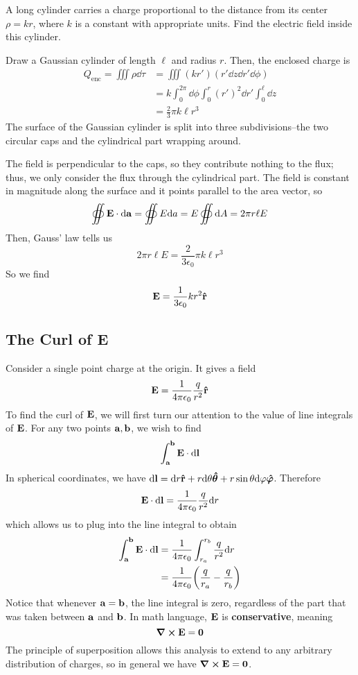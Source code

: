 \begin{example}
    A long cylinder carries a charge proportional to the distance from its center $\rho = kr$, where $k$ is a constant with appropriate units. Find the electric field inside this cylinder.

    Draw a Gaussian cylinder of length $\ell$ and radius $r$. Then, the enclosed charge is 
    \begin{align*}
        Q_\text{enc} = \iiint \rho \dd \tau &= \iiint (kr')(r'\dd z\dd r'\dd \phi) \\
        &= k\int_0^{2\pi}\dd \phi \int_0^r (r')^2\dd r' \int_0^\ell \dd z \\
        &= \frac{2}{3}\pi k\ell r^3
    \end{align*}
    The surface of the Gaussian cylinder is split into three subdivisions--the two circular caps and the cylindrical part wrapping around. 

    The field is perpendicular to the caps, so they contribute nothing to the flux; thus, we only consider the flux through the cylindrical part. The field is constant in magnitude along the surface and it points parallel to the area vector, so
    \[ \oiint \mathbf{E} \cdot \dd \mathbf{a} = \oiint E\dd a = E\oiint \dd A = 2\pi r \ell E\]
    Then, Gauss' law tells us
    \[ 2\pi r \ell E = \frac{2}{3\epsilon_0}\pi k \ell r^3\]
    So we find
    \[ \mathbf{E} = \frac{1}{3\epsilon_0}kr^2\mathbf{\hat{r}} \]
\end{example}
\subsection*{The Curl of E}
Consider a single point charge at the origin. It gives a field
\[ \mathbf{E} = \frac{1}{4\pi \epsilon_0} \frac{q}{r^2} \mathbf{\hat{r}} \]
To find the curl of $\mathbf{E}$, we will first turn our attention to the value of line integrals of $\mathbf{E}$. For any two points $\mathbf{a}, \mathbf{b}$, we wish to find
\[ \int_{\mathbf{a}}^{\mathbf{b}} \mathbf{E} \cdot \dd \mathbf{l}\]
In spherical coordinates, we have $\dd\mathbf{l} = \dd r \mathbf{\hat{r}} + r\dd\theta\boldsymbol{\hat\theta} + r\sin\theta \dd\varphi\boldsymbol{\hat{\varphi}}$. Therefore
\[ \mathbf{E} \cdot \dd \mathbf{l} = \frac{1}{4\pi \epsilon_0}\frac{q}{r^2}\dd r\]
which allows us to plug into the line integral to obtain
\begin{align*}
    \int_\mbf{a}^\mbf{b} \mbf E \cdot \dd \mbf l &= \K \int_{r_a}^{r_b} \frac{q}{r^2}\dd r \\
    &= \K \pqty{\frac{q}{r_a}-\frac{q}{r_b}}
\end{align*}
Notice that whenever $\mathbf{a} = \mathbf{b}$, the line integral is zero, regardless of the part that was taken between $\mathbf{a}$ and $\mathbf{b}$. In math language, $\mathbf{E}$ is \textbf{conservative}, meaning 
\begin{equation}
    \curl\mathbf{E} = \mathbf{0}
\end{equation}
The principle of superposition allows this analysis to extend to any arbitrary distribution of charges, so in general we have $\curl\mathbf{E} = \mathbf{0}$.
